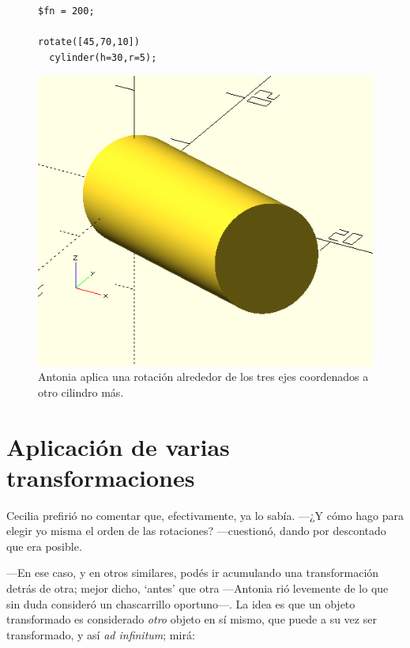   \begin{figure}[ht]
  \begin{minipage}[]{.5\textwidth}
    \begin{lstlisting}
$fn = 200;

rotate([45,70,10])
  cylinder(h=30,r=5);
    \end{lstlisting}%
  \end{minipage}\hfill
    \begin{minipage}[]{.5\textwidth}
      \centering
      \includegraphics[width=.6\textwidth]{imagenes/cilindro-rotado-xyz}
    \end{minipage}
    \caption{Antonia aplica una rotación alrededor de los tres ejes
      coordenados a otro cilindro más.}
  \label{fig:cilindro-rotado-xyz}
\end{figure}


\section{Aplicación de varias transformaciones}


Cecilia prefirió no comentar que, efectivamente, ya lo sabía. ---¿Y
cómo hago para elegir yo misma el orden de las rotaciones?
---cuestionó, dando por descontado que era posible.

---En ese caso, y en otros similares, podés ir acumulando una
transformación detrás de otra; mejor dicho, `antes' que otra
---An\-to\-nia rió levemente de lo que sin duda consideró un
chascarrillo oportuno---. La idea es que un objeto transformado es
considerado \emph{otro} objeto en sí mismo, que puede a su vez ser
transformado, y así \emph{ad infinitum}; mirá:


